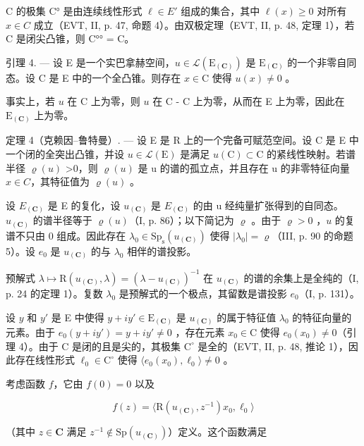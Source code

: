 C 的极集 C° 是由连续线性形式 \(\ell \in E'\) 组成的集合，其中 \(\ell(x) \geqslant 0\) 对所有 \(x \in C\) 成立（EVT, II, p. 47, 命题 4）。由双极定理（EVT, II, p. 48, 定理 1），若 C 是闭尖凸锥，则 C°° = C。

引理 4. --- 设 E 是一个实巴拿赫空间，\(u \in \mathcal{L}(\mathrm{E}_{(\mathbf{C})})\) 是 \(\mathrm{E}_{(\mathbf{C})}\) 的一个非零自同态。设 C 是 E 中的一个全凸锥。则存在 \(x \in \mathrm{C}\) 使得 \(u(x) \neq 0\) 。

事实上，若 \(u\) 在 C 上为零，则 \(u\) 在 C - C 上为零，从而在 E 上为零，因此在 \(\mathrm{E}_{(\mathbf{C})}\) 上为零。

定理 4（克赖因–鲁特曼）. --- 设 E 是 R 上的一个完备可赋范空间。设 C 是 E 中一个闭的全突出凸锥，并设 \(u \in \mathcal{L}(\mathrm{E})\) 是满足 \(u(\mathrm{C}) \subset \mathrm{C}\) 的紧线性映射。若谱半径 \(\varrho(u)\) \textgreater0，则 \(\varrho(u)\) 是 u 的谱的孤立点，并且存在 u 的非零特征向量 \(x \in C\)，其特征值为 \(\varrho(u)\) 。

设 \(E_{(\mathbf{C})}\) 是 E 的复化，设 \(u_{(\mathbf{C})}\) 是 \(E_{(\mathbf{C})}\) 的由 u 经纯量扩张得到的自同态。\(u_{(\mathbf{C})}\) 的谱半径等于 \(\varrho(u)\)（I, p. 86）；以下简记为 \(\varrho\) 。由于 \(\varrho > 0\) ，\(u\) 的复谱不只由 0 组成。因此存在 \(\lambda_0 \in \mathrm{Sp}_\mathrm{s}(u_{(\mathbf{C})})\) 使得 \(|\lambda_0| = \varrho\)（III, p. 90 的命题 5）。设 \(e_0\) 是 \(u_{(\mathbf{C})}\) 的与 \(\lambda_0\) 相伴的谱投影。

预解式 \(\lambda \mapsto \mathrm{R}(u_{(\mathbf{C})},\lambda) = (\lambda -u_{(\mathbf{C})})^{-1}\) 在 \(u_{(\mathbf{C})}\) 的谱的余集上是全纯的（I, p. 24 的定理 1）。复数 \(\lambda_0\) 是预解式的一个极点，其留数是谱投影 \(e_0\)（I, p. 131）。

设 \(y\) 和 \(y'\) 是 E 中使得 \(y + iy' \in \mathrm{E}_{(\mathbf{C})}\) 是 \(u_{(\mathbf{C})}\) 的属于特征值 \(\lambda_0\) 的特征向量的元素。由于 \(e_0(y + iy') = y + iy' \neq 0\) ，存在元素 \(x_0 \in \mathrm{C}\) 使得 \(e_0(x_0) \neq 0\)（引理 4）。由于 C 是闭的且是尖的，其极集 \(\mathrm{C}^\circ\) 是全的（EVT, II, p. 48, 推论 1），因此存在线性形式 \(\ell_0 \in \mathrm{C}^\circ\) 使得 \(\langle e_0(x_0), \ell_0 \rangle \neq 0\) 。

考虑函数 \(f\)，它由 \(f(0)=0\) 以及

\[
f (z) = \langle \mathrm{R} (u _ {(\mathbf {C})}, z ^ {- 1}) x _ {0}, \ell_ {0} \rangle
\]

（其中 \(z \in \mathbf{C}\) 满足 \(z^{-1} \notin \mathrm{Sp}(u_{(\mathbf{C})})\)）定义。这个函数满足

